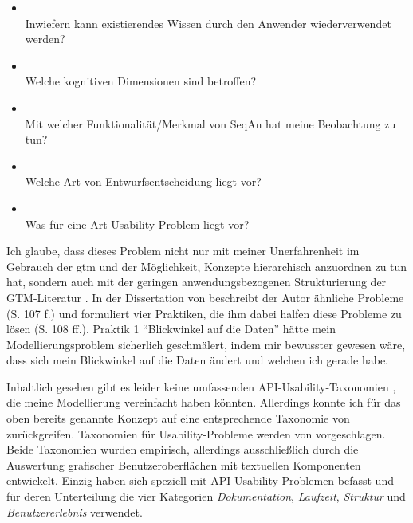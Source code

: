 \begin{itemize}
  \item {}\\Inwiefern kann existierendes Wissen durch den Anwender wiederverwendet werden?
  \item {}\\Welche kognitiven Dimensionen sind betroffen?
  \item {}\\Mit welcher Funktionalität/Merkmal von SeqAn hat meine Beobachtung zu tun?
  \item {}\\Welche Art von Entwurfsentscheidung liegt vor?
  \item {}\\Was für eine Art Usability-Problem liegt vor?
\end{itemize}

Ich glaube, dass dieses Problem nicht nur mit meiner Unerfahrenheit im Gebrauch der \gls{gtm} und der Möglichkeit, Konzepte hierarchisch anzuordnen zu tun hat, sondern auch mit der geringen anwendungsbezogenen Strukturierung der GTM-Literatur \citep[insb.][]{strauss1990basics,strauss1987qualitative,glaser1978theoretical}. In der Dissertation von \cite{Salinger:2013vd} beschreibt der Autor ähnliche Probleme (S. 107 f.) und formuliert vier Praktiken, die ihm dabei halfen diese Probleme zu lösen (S. 108 ff.). Praktik 1 ``Blickwinkel auf die Daten'' hätte mein Modellierungsproblem sicherlich geschmälert, indem mir bewusster gewesen wäre, dass sich mein Blickwinkel auf die Daten ändert und welchen ich gerade habe.

Inhaltlich gesehen gibt es leider keine umfassenden API-Usability-Taxonomien \citep{Daughtry:2009be}, die meine Modellierung vereinfacht haben könnten. Allerdings konnte ich für das oben bereits genannte Konzept  auf eine entsprechende Taxonomie von \cite{Stylos:2007ip} zurückgreifen. Taxonomien für Usability-Probleme werden von \cite{Khajouei:2011bm,Keenan:1999di} vorgeschlagen. Beide Taxonomien wurden empirisch, allerdings ausschließlich durch die Auswertung grafischer Benutzeroberflächen mit textuellen Komponenten entwickelt. Einzig \cite{Grill:2012jm} haben sich speziell mit API-Usability-Problemen befasst und für deren Unterteilung die vier Kategorien \textit{Dokumentation}, \textit{Laufzeit}, \textit{Struktur} und \textit{Benutzererlebnis} verwendet.

